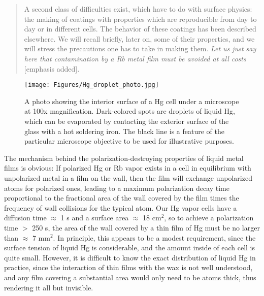 \documentclass [10pt, twoside] {uwthesis}[2012/04/02]
\begin{document}
\begin{quote} A second class of difficulties exist, which have to do with surface physics: the making of coatings with properties which are reproducible from day to day or in different cells. The behavior of these coatings has been described elsewhere. We will recall briefly, later on, some of their properties, and we will stress the precautions one has to take in making them. \textit{Let us just say here that contamination by a Rb metal film must be avoided at all costs} [emphasis added].\end{quote} 
\begin{figure}
\begin{center}
\texttt{[image: Figures/Hg\_droplet\_photo.jpg]}
\end{center}
\caption[Interior surface of a cell endcap with $^{199}$Hg droplets]%
{\narrower A photo showing the interior surface of a Hg cell under a microscope at 100x magnification. Dark-colored spots are droplets of liquid Hg, which can be evaporated by contacting the exterior surface of the glass with a hot soldering iron. The black line is a feature of the particular microscope objective to be used for illustrative purposes.}
\label{HgDroplet}
\end{figure}
The mechanism behind the polarization-destroying properties of liquid metal films is obvious: If polarized Hg or Rb vapor exists in a cell in equilibrium with unpolarized metal in a film on the wall, then the film will exchange unpolarized atoms for polarized ones, leading to a maximum polarization decay time proportional to the fractional area of the wall covered by the film times the frequency of wall collisions for the typical atom. Our Hg vapor cells have a diffusion time $\approx$ 1 s and a surface area $\approx$ 18 cm$^2$, so to achieve a polarization time $>$ 250 s, the area of the wall covered by a thin film of Hg must be no larger than $\approx$ 7 mm$^2$. In principle, this appears to be a modest requirement, since the surface tension of liquid Hg is considerable, and the amount inside of each cell is quite small. However, it is difficult to know the exact distribution of liquid Hg in practice, since the interaction of thin films with the wax is not well understood, and any film covering a substantial area would only need to be atoms thick, thus rendering it all but invisible.
\end{document}

